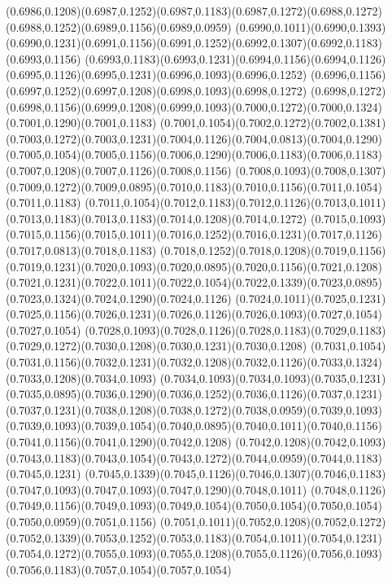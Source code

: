 (0.6986,0.1208)(0.6987,0.1252)(0.6987,0.1183)(0.6987,0.1272)(0.6988,0.1272)(0.6988,0.1252)(0.6989,0.1156)(0.6989,0.0959)
(0.6990,0.1011)(0.6990,0.1393)(0.6990,0.1231)(0.6991,0.1156)(0.6991,0.1252)(0.6992,0.1307)(0.6992,0.1183)(0.6993,0.1156)
(0.6993,0.1183)(0.6993,0.1231)(0.6994,0.1156)(0.6994,0.1126)(0.6995,0.1126)(0.6995,0.1231)(0.6996,0.1093)(0.6996,0.1252)
(0.6996,0.1156)(0.6997,0.1252)(0.6997,0.1208)(0.6998,0.1093)(0.6998,0.1272)
\PST@Solid(0.6998,0.1272)(0.6998,0.1156)(0.6999,0.1208)(0.6999,0.1093)(0.7000,0.1272)(0.7000,0.1324)(0.7001,0.1290)(0.7001,0.1183)
(0.7001,0.1054)(0.7002,0.1272)(0.7002,0.1381)(0.7003,0.1272)(0.7003,0.1231)(0.7004,0.1126)(0.7004,0.0813)(0.7004,0.1290)
(0.7005,0.1054)(0.7005,0.1156)(0.7006,0.1290)(0.7006,0.1183)(0.7006,0.1183)(0.7007,0.1208)(0.7007,0.1126)(0.7008,0.1156)
(0.7008,0.1093)(0.7008,0.1307)(0.7009,0.1272)(0.7009,0.0895)(0.7010,0.1183)(0.7010,0.1156)(0.7011,0.1054)(0.7011,0.1183)
(0.7011,0.1054)(0.7012,0.1183)(0.7012,0.1126)(0.7013,0.1011)(0.7013,0.1183)(0.7013,0.1183)(0.7014,0.1208)(0.7014,0.1272)
(0.7015,0.1093)(0.7015,0.1156)(0.7015,0.1011)(0.7016,0.1252)(0.7016,0.1231)(0.7017,0.1126)(0.7017,0.0813)(0.7018,0.1183)
(0.7018,0.1252)(0.7018,0.1208)(0.7019,0.1156)(0.7019,0.1231)(0.7020,0.1093)(0.7020,0.0895)(0.7020,0.1156)(0.7021,0.1208)
(0.7021,0.1231)(0.7022,0.1011)(0.7022,0.1054)(0.7022,0.1339)(0.7023,0.0895)(0.7023,0.1324)(0.7024,0.1290)(0.7024,0.1126)
(0.7024,0.1011)(0.7025,0.1231)(0.7025,0.1156)(0.7026,0.1231)(0.7026,0.1126)(0.7026,0.1093)(0.7027,0.1054)(0.7027,0.1054)
(0.7028,0.1093)(0.7028,0.1126)(0.7028,0.1183)(0.7029,0.1183)(0.7029,0.1272)(0.7030,0.1208)(0.7030,0.1231)(0.7030,0.1208)
(0.7031,0.1054)(0.7031,0.1156)(0.7032,0.1231)(0.7032,0.1208)(0.7032,0.1126)(0.7033,0.1324)(0.7033,0.1208)(0.7034,0.1093)
(0.7034,0.1093)(0.7034,0.1093)(0.7035,0.1231)(0.7035,0.0895)(0.7036,0.1290)(0.7036,0.1252)(0.7036,0.1126)(0.7037,0.1231)
(0.7037,0.1231)(0.7038,0.1208)(0.7038,0.1272)(0.7038,0.0959)(0.7039,0.1093)
\PST@Solid(0.7039,0.1093)(0.7039,0.1054)(0.7040,0.0895)(0.7040,0.1011)(0.7040,0.1156)(0.7041,0.1156)(0.7041,0.1290)(0.7042,0.1208)
(0.7042,0.1208)(0.7042,0.1093)(0.7043,0.1183)(0.7043,0.1054)(0.7043,0.1272)(0.7044,0.0959)(0.7044,0.1183)(0.7045,0.1231)
(0.7045,0.1339)(0.7045,0.1126)(0.7046,0.1307)(0.7046,0.1183)(0.7047,0.1093)(0.7047,0.1093)(0.7047,0.1290)(0.7048,0.1011)
(0.7048,0.1126)(0.7049,0.1156)(0.7049,0.1093)(0.7049,0.1054)(0.7050,0.1054)(0.7050,0.1054)(0.7050,0.0959)(0.7051,0.1156)
(0.7051,0.1011)(0.7052,0.1208)(0.7052,0.1272)(0.7052,0.1339)(0.7053,0.1252)(0.7053,0.1183)(0.7054,0.1011)(0.7054,0.1231)
(0.7054,0.1272)(0.7055,0.1093)(0.7055,0.1208)(0.7055,0.1126)(0.7056,0.1093)(0.7056,0.1183)(0.7057,0.1054)(0.7057,0.1054)
